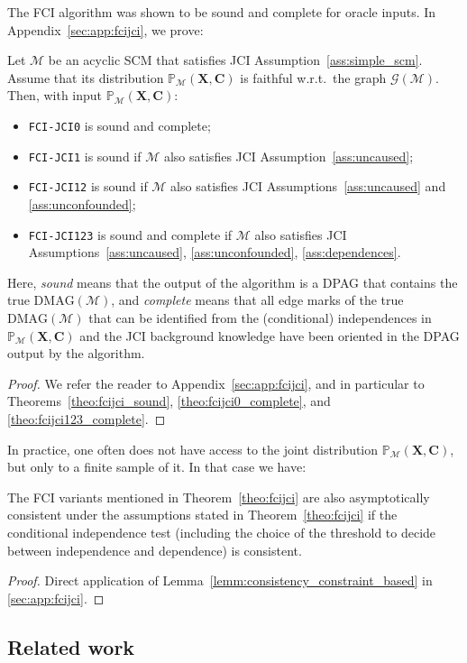 \documentclass[twoside,11pt]{article}
\newcommand{\Prb}{\mathbb{P}}
\newcommand\B[1]{\bm{#1}}
\newcommand\C[1]{\mathcal{#1}}
\newcommand{\DMAG}{\mathrm{DMAG}}
\newcommand{\alg}[1]{\texttt{#1}}
\newcommand{\JCIABC}{\ref{ass:uncaused}, \ref{ass:unconfounded}, \ref{ass:dependences}}
\begin{document}
The FCI algorithm was shown to be sound and complete \citep{Zhang2008_AI} for oracle inputs.
In Appendix~\ref{sec:app:fcijci}, we prove:
\begin{theorem}\label{theo:fcijci}
  Let $\C{M}$ be an acyclic SCM that satisfies JCI Assumption~\ref{ass:simple_scm}.
  Assume that its distribution $\Prb_{\C{M}}(\B{X},\B{C})$ is faithful w.r.t.\ the graph $\C{G}(\C{M})$. 
  Then, with input $\Prb_{\C{M}}(\B{X},\B{C})$:
  \begin{itemize}
    \item \alg{FCI-JCI0} is sound and complete;
    \item \alg{FCI-JCI1} is sound if $\C{M}$ also satisfies JCI Assumption~\ref{ass:uncaused};
    \item \alg{FCI-JCI12} is sound if $\C{M}$ also satisfies JCI Assumptions~\ref{ass:uncaused} and \ref{ass:unconfounded};
    \item \alg{FCI-JCI123} is sound and complete if $\C{M}$ also satisfies JCI Assumptions~\JCIABC.
  \end{itemize}
  Here, \emph{sound} means that the output of the algorithm is a DPAG that contains the true $\DMAG(\C{M})$, and \emph{complete} means that all edge marks of the true $\DMAG(\C{M})$ that can be identified from the (conditional) independences in $\Prb_{\C{M}}(\B{X},\B{C})$ and the JCI background knowledge have been oriented in the DPAG output by the algorithm.
\end{theorem}
\begin{proof}
  We refer the reader to Appendix~\ref{sec:app:fcijci}, and in particular to Theorems~\ref{theo:fcijci_sound}, \ref{theo:fcijci0_complete}, and \ref{theo:fcijci123_complete}.
\end{proof}
In practice, one often does not have access to the joint distribution $\Prb_{\C{M}}(\B{X},\B{C})$, but only to a finite sample of it.
In that case we have:
\begin{corollary}
  The FCI variants mentioned in Theorem~\ref{theo:fcijci} are also asymptotically consistent under the assumptions stated in Theorem~\ref{theo:fcijci} if the conditional independence test (including the choice of the threshold to decide between independence and dependence) is consistent.
\end{corollary}
\begin{proof}
  Direct application of Lemma~\ref{lemm:consistency_constraint_based} in \ref{sec:app:fcijci}.
\end{proof}

\subsection{Related work}\label{sec:related_work}
\end{document}
